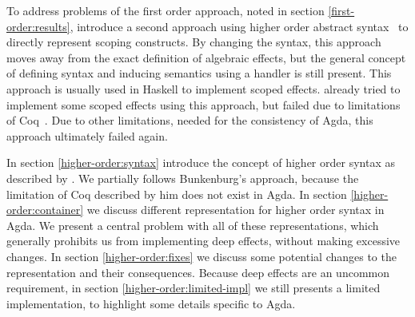 
To address problems of the first order approach, noted in section
\ref{first-order:results}, \citeauthor{DBLP:conf/haskell/WuSH14} introduce a
second approach using higher order abstract
syntax~\cite{DBLP:conf/haskell/WuSH14} to directly represent scoping
constructs. 
By changing the syntax, this approach moves away from the exact definition of
algebraic effects, but the general concept of defining syntax and inducing
semantics using a handler is still present.
This approach is usually used in Haskell to implement scoped effects.
\citeauthor{bunkenburg2019modeling} already tried to implement some scoped
effects using this approach, but failed due to limitations of
Coq~\cite{bunkenburg2019modeling}.
Due to other limitations, needed for the consistency of Agda, this approach
ultimately failed again.

In section \ref{higher-order:syntax} introduce the concept of higher order
syntax as described by \textcite{DBLP:conf/haskell/WuSH14}.
We partially follows Bunkenburg's approach, because the limitation of Coq
described by him does not exist in Agda.
In section \ref{higher-order:container} we discuss different
representation for higher order syntax in Agda.
We present a central problem with all of these representations, which generally
prohibits us from implementing deep effects, without making excessive changes.
In section \ref{higher-order:fixes} we discuss some potential changes to the
representation and their consequences.
Because deep effects are an uncommon requirement, in section
\ref{higher-order:limited-impl} we still presents a limited implementation,
to highlight some details specific to Agda.


